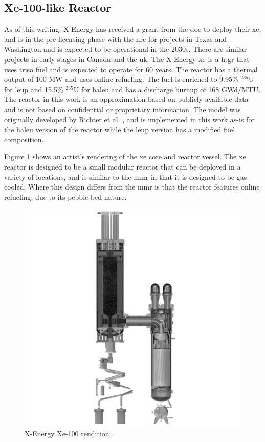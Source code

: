 \subsection{Xe-100-like Reactor}
\label{sec:xe}

As of this writing, X-Energy has received a grant from the \gls{doe} to deploy their \gls{xe}, and is in the pre-licensing phase with the \gls{nrc} for projects in Texas and Washington and is expected to be operational in the 2030s. There are similar projects in early stages in Canada and the \gls{uk}. The X-Energy \gls{xe} is a \gls{htgr} that uses \gls{triso} fuel and is expected to operate for 60 years. The reactor has a thermal output of 100 MW and uses online refueling. The fuel is enriched to 9.95\% $^{235}$U for \gls{leup} and 15.5\% $^{235}$U for \gls{haleu} and has a discharge burnup of 168 GWd/MTU. The reactor in this work is an approximation based on publicly available data and is not based on confidential or proprietary information. The model was originally developed by Richter et al. \cite{richter_xe100_like}, and is implemented in this work as-is for the \gls{haleu} version of the reactor while the \gls{leup} version has a modified fuel composition.

Figure \ref{fig:xe_design} shows an artist's rendering of the \gls{xe} core and reactor vessel. The \gls{xe} reactor is designed to be a small modular reactor that can be deployed in a variety of locations, and is similar to the \gls{mmr} in that it is designed to be gas cooled. Where this design differs from the \gls{mmr} is that the reactor features online refueling, due to its pebble-bed nature.

\begin{figure}[H]
    \centering
    \includegraphics[scale=0.09]{images/reactor_design/xe-100-reactor-slice.jpg}
    \caption{X-Energy Xe-100 rendition \cite{xe_reactor}.}
    \label{fig:xe_design}
\end{figure}

